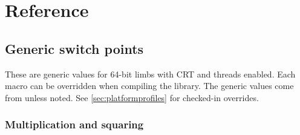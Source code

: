 \chapter{Reference}
\label{app:ref}

\section{Generic switch points}

These are generic values for 64-bit limbs with CRT and threads enabled.
Each macro can be overridden when compiling the library. The generic
values come from 
unless noted. See \cref{sec:platformprofiles} for checked-in overrides.

\subsection*{Multiplication and squaring}

